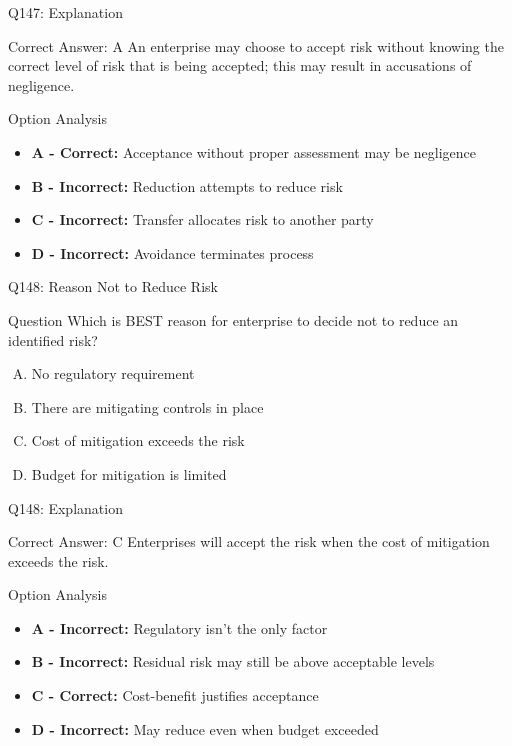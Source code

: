 \documentclass{beamer}
\begin{document}
	\begin{frame}{Q147: Explanation}
		\begin{block}{Correct Answer: A}
			An enterprise may choose to accept risk without knowing the correct level of risk that is being accepted; this may result in accusations of negligence.
		\end{block}
		\begin{block}{Option Analysis}
			\begin{itemize}
				\item \textbf{A - Correct:} Acceptance without proper assessment may be negligence
				\item \textbf{B - Incorrect:} Reduction attempts to reduce risk
				\item \textbf{C - Incorrect:} Transfer allocates risk to another party
				\item \textbf{D - Incorrect:} Avoidance terminates process
			\end{itemize}
		\end{block}
	\end{frame}
	
	\begin{frame}{Q148: Reason Not to Reduce Risk}
		\begin{block}{Question}
			Which is BEST reason for enterprise to decide not to reduce an identified risk?
		\end{block}
		\begin{enumerate}[(A)]
			\item No regulatory requirement
			\item There are mitigating controls in place
			\item Cost of mitigation exceeds the risk
			\item Budget for mitigation is limited
		\end{enumerate}
	\end{frame}
	
	\begin{frame}{Q148: Explanation}
		\begin{block}{Correct Answer: C}
			Enterprises will accept the risk when the cost of mitigation exceeds the risk.
		\end{block}
		\begin{block}{Option Analysis}
			\begin{itemize}
				\item \textbf{A - Incorrect:} Regulatory isn't the only factor
				\item \textbf{B - Incorrect:} Residual risk may still be above acceptable levels
				\item \textbf{C - Correct:} Cost-benefit justifies acceptance
				\item \textbf{D - Incorrect:} May reduce even when budget exceeded
			\end{itemize}
		\end{block}
	\end{frame}
	
\end{document}
